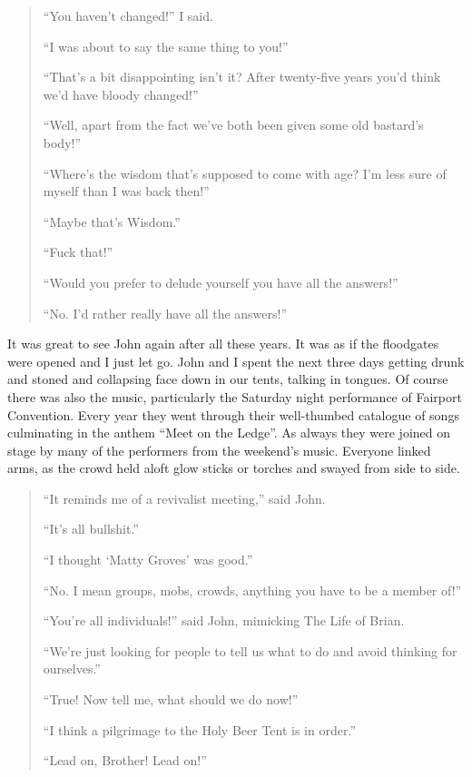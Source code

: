 \documentclass[12pt]{memoir}
\def\–{-\hskip0pt}
\begin{document}
\begin{quote}
“You haven’t changed!” I said.

“I was about to say the same thing to you!”

“That’s a bit disappointing isn’t it?
After twenty-five years you’d think we’d have bloody changed!”

“Well, apart from the fact we’ve both been given some old bastard’s body!”

“Where’s the wisdom that’s supposed to come with age?
I’m less sure of myself than I was back then!”

“Maybe that’s Wisdom.”

“Fuck that!”

“Would you prefer to delude yourself you have all the answers!”

“No. I’d rather really have all the answers!”
\end{quote}

It was great to see John again after all these years.
It was as if the floodgates were opened and I just let go.
John and I spent the next three days getting drunk and stoned
and collapsing face down in our tents, talking in tongues.
Of course there was also the music,
particularly the Saturday night performance of Fairport Convention.
Every year they went through their well\–thumbed catalogue of songs
culminating in the anthem “Meet on the Ledge”.
As always they were joined on stage by many
of the performers from the weekend’s music.
Everyone linked arms, as the crowd held aloft glow sticks
or torches and swayed from side to side.

\begin{quote}
“It reminds me of a revivalist meeting,” said John.

“It’s all bullshit.”

“I thought ‘Matty Groves’ was good.”

“No. I mean groups, mobs, crowds, anything you have to be a member of!”

“You’re all individuals!” said John, mimicking The Life of Brian.

“We’re just looking for people to tell us
what to do and avoid thinking for ourselves.”

“True! Now tell me, what should we do now!”

“I think a pilgrimage to the Holy Beer Tent is in order.”

“Lead on, Brother! Lead on!”
\end{quote}


\end{document}

